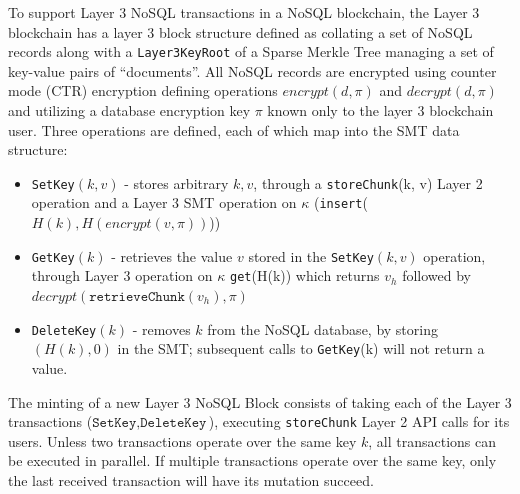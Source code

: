 \documentclass{article}
\newcommand{\databaseencryptionkey}{\pi}
\newcommand{\keyroot}{\kappa}
\newcommand{\hash}[1]{H(#1)}
\newcommand{\encrypt}[1]{encrypt(#1, \databaseencryptionkey)}
\newcommand{\decrypt}[1]{decrypt(#1, \databaseencryptionkey)}
\newcommand{\emptyhash}{0}
\begin{document}
To support Layer 3 NoSQL transactions in a NoSQL blockchain, the Layer 3 blockchain has a layer 3 block structure defined as collating a set of NoSQL records along with a {\tt Layer3KeyRoot} of a Sparse Merkle Tree managing a set of key-value pairs of ``documents''.  All NoSQL records are encrypted using counter mode (CTR) encryption defining operations $\encrypt{d}$ and $\decrypt{d}$ and utilizing a database encryption key $\databaseencryptionkey$ known only to the layer 3 blockchain user.   Three operations are defined, each of which map into the SMT data structure: 
\begin{itemize}
\item \texttt{SetKey}$(k,v)$ - stores arbitrary $k,v$, through a \texttt{storeChunk}(k, v) Layer 2 operation and a Layer 3 SMT operation on $\keyroot$ (\texttt{insert}($\hash{k},\hash{\encrypt{v}}$)) 
\item \texttt{GetKey}$(k)$ - retrieves the value $v$ stored in the {\tt SetKey}$(k,v)$ operation, through Layer 3 operation on $\keyroot$ \texttt{get}(\hash{k}) which returns $v_h$ followed by $\decrypt{\texttt{retrieveChunk}(v_h)}$ 
\item \texttt{DeleteKey}$(k)$ - removes $k$ from the NoSQL database, by storing $(\hash{k},\emptyhash)$ in the SMT; subsequent calls to \texttt{GetKey}(k) will not return a value.
\end{itemize}
The minting of a new Layer 3 NoSQL Block consists of taking each of the Layer 3 transactions ($\texttt{SetKey}, \texttt{DeleteKey}$), executing  \texttt{storeChunk} Layer 2 API calls for its users.  Unless two transactions operate over the same key $k$, all transactions can be executed in parallel.  If multiple transactions operate over the same key, only the last received transaction will have its mutation succeed.  
\end{document}
